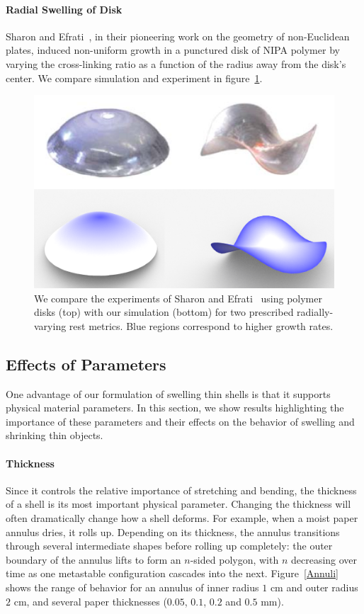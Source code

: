 \documentclass[timestamp,acmtog]{acmart}
\begin{document}
\paragraph{Radial Swelling of Disk}
Sharon and Efrati~, in their pioneering work on the geometry of non-Euclidean plates, induced non-uniform growth in a punctured disk of NIPA polymer by varying the cross-linking ratio as a function of the radius away from the disk's center. We compare simulation and experiment in figure~\ref{SwellingDisc}.

\begin{figure}[h]
  \centering
  \includegraphics[width=\linewidth]{SwellingDiscnew.png}
  \caption{We compare the experiments of Sharon and Efrati~ using polymer disks (top) with our simulation (bottom) for two prescribed radially-varying rest metrics. Blue regions correspond to higher growth rates. }
  \label{SwellingDisc}
\end{figure}

\subsection{Effects of Parameters}
One advantage of our formulation of swelling thin shells is that it supports physical material parameters. In this section, we show results highlighting the importance of these parameters and their effects on the behavior of swelling and shrinking thin objects.

\paragraph{Thickness}
Since it controls the relative importance of stretching and bending, the thickness of a shell is its most important physical parameter. Changing the thickness will often dramatically change how a shell deforms. For example, when a moist paper annulus dries, it rolls up. Depending on its thickness, the annulus transitions through several intermediate shapes before rolling up completely: the outer boundary of the annulus lifts to form an $n$-sided polygon, with $n$ decreasing over time as one metastable configuration cascades into the next. Figure~\ref{Annuli} shows the range of behavior for an annulus of inner radius $1$ cm and outer radius $2$ cm, and several paper thicknesses ($0.05$, $0.1$, $0.2$ and $0.5$ mm).
\end{document}
